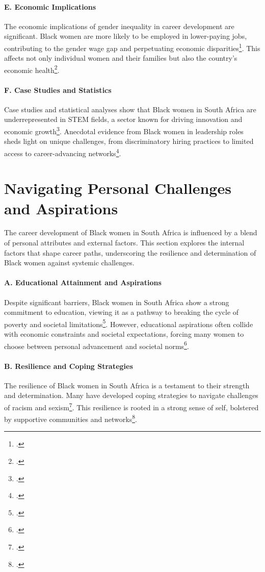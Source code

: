 \documentclass{article}
\begin{document}
\paragraph{E. Economic Implications}
The economic implications of gender inequality in career development are significant. Black women are more likely to be employed in lower-paying jobs, contributing to the gender wage gap and perpetuating economic disparities\footcite{makua2022does}. This affects not only individual women and their families but also the country’s economic health\footcite{hinks2002gender}.

\paragraph{F. Case Studies and Statistics}
Case studies and statistical analyses show that Black women in South Africa are underrepresented in STEM fields, a sector known for driving innovation and economic growth\footcite{britton2002incomplete}. Anecdotal evidence from Black women in leadership roles sheds light on unique challenges, from discriminatory hiring practices to limited access to career-advancing networks\footcite{mokgoro2003constitutional}.

\section{Navigating Personal Challenges and Aspirations}

The career development of Black women in South Africa is influenced by a blend of personal attributes and external factors. This section explores the internal factors that shape career paths, underscoring the resilience and determination of Black women against systemic challenges.

\paragraph{A. Educational Attainment and Aspirations}
Despite significant barriers, Black women in South Africa show a strong commitment to education, viewing it as a pathway to breaking the cycle of poverty and societal limitations\footcite{monnapula-mapesela2017developing}. However, educational aspirations often collide with economic constraints and societal expectations, forcing many women to choose between personal advancement and societal norms\footcite{doubell2014perceptions}.

\paragraph{B. Resilience and Coping Strategies}
The resilience of Black women in South Africa is a testament to their strength and determination. Many have developed coping strategies to navigate challenges of racism and sexism\footcite{chinyamurindi2016narrative}. This resilience is rooted in a strong sense of self, bolstered by supportive communities and networks\footcite{watson1995career}.
\end{document}
